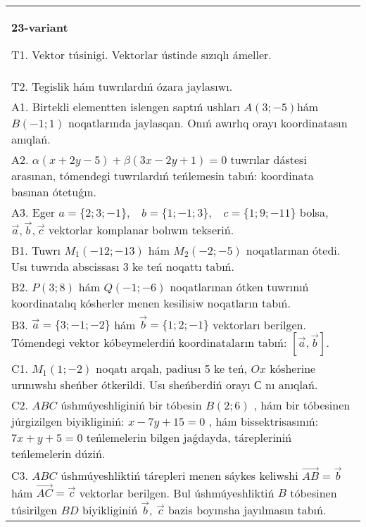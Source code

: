 \documentclass{article}
\begin{document}
\begin{tabular}{m{17cm}}
\textbf{23-variant}
\newline

T1. 
Vektor túsinigi. Vektorlar ústinde sızıqlı ámeller.
 \\
T2. 
Tegislik hám tuwrılardıń ózara jaylasıwı.
 \\
A1. 
Birtekli elementten islengen saptıń ushları
$A(3;-5)$hám $B(-1;1)$ noqatlarında jaylasqan. Onıń awırlıq
orayı koordinatasın anıqlań.
 \\
A2. 
$\alpha(x+2y-5)+\beta(3x-2y+1)=0$ tuwrılar
dástesi arasınan, tómendegi tuwrılardıń teńlemesin tabıń:
koordinata basınan ótetuǵın.
 \\
A3. 
Eger \(a = \{ 2;3; - 1\},\ \ \ \ b = \{ 1; - 1;3\},\ \ \ \ c = \{ 1;9; - 11\}\) bolsa, $\overrightarrow{a}, \overrightarrow{b}, \overrightarrow{c}$ vektorlar komplanar bolıwın tekseriń.
 \\
B1. 
Tuwrı \(M_{1}(-12;-13)\) hám \(M_{2}(-2;-5)\)
noqatlarınan ótedi. Usı tuwrıda abscissası 3 ke teń noqattı tabıń.
 \\
B2. 
\(P(3;8)\) hám \(Q(-1;-6)\) noqatlarınan ótken
tuwrınıń koordinatalıq kósherler menen kesilisiw noqatların tabıń.
 \\
B3. 
$\vec{a} = \{ 3; - 1; - 2\}$ hám $\vec{b} = \{ 1;2; - 1\}$ vektorları berilgen. Tómendegi vektor kóbeymelerdiń koordinataların tabıń: 
$\left\lbrack \vec{a},\vec{b} \right\rbrack$.
 \\
C1. 
\(M_{1}(1; - 2)\) noqatı arqalı, padiusı 5 ke teń,
$Ox$ kósherine urınıwshı sheńber ótkerildi. Usı sheńberdiń orayı
$С$ nı anıqlań.
 \\
C2. 
$ABC$ úshmúyeshliginiń bir tóbesin \(B(2;6)\) , hám
bir tóbesinen júrgizilgen biyikliginiń: \(x - 7y + 15 = 0\) , hám
bissektrisasınıń: \(7x + y + 5 = 0\) teńlemelerin bilgen jaǵdayda,
tárepleriniń teńlemelerin dúziń.
 \\
C3. 
\(ABC\) úshmúyeshliktiń tárepleri menen sáykes keliwshi \(\vec{AB} = \vec{b}\) hám \(\vec{AC} = \vec{c}\) vektorlar berilgen. Bul úshmúyeshliktiń \(B\) tóbesinen túsirilgen \(BD\) biyikliginiń \(\vec{b},\ \vec{c}\) bazis boyınsha jayılmasın tabıń.
 \\

\end{tabular}
\vspace{1cm}
\end{document}
